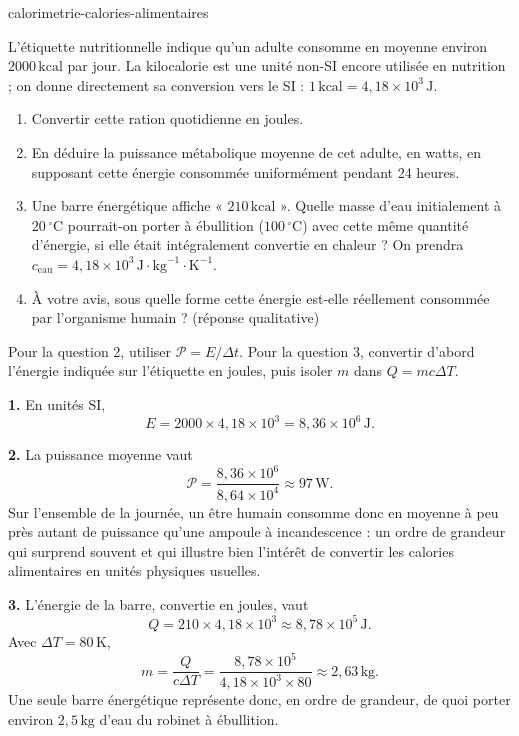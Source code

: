 \begin{exo}{calorimetrie-calories-alimentaires}

L'étiquette nutritionnelle indique qu'un adulte consomme en moyenne environ $2000\,\text{kcal}$ par jour. La kilocalorie est une unité non-SI encore utilisée en nutrition ; on donne directement sa conversion vers le SI : $1\,\text{kcal}=4{,}18\times10^3\,\text{J}$.

\begin{enumerate}
  \item Convertir cette ration quotidienne en joules.
  \item En déduire la puissance métabolique moyenne de cet adulte,
  en watts, en supposant cette énergie consommée uniformément pendant 24 heures.
  \item Une barre énergétique affiche « $210\,\text{kcal}$ ». Quelle masse d'eau initialement à $20\,^\circ\text{C}$ pourrait-on porter à ébullition ($100\,^\circ\text{C}$) avec cette même quantité d'énergie, si elle était intégralement convertie en chaleur ? On prendra $c_{\text{eau}} = 4{,}18\times10^3\,\text{J}\!\cdot\!\text{kg}^{-1}\!\cdot\!\text{K}^{-1}$.
  \item À votre avis, sous quelle forme cette énergie est-elle réellement consommée par l'organisme humain ? (réponse qualitative)
\end{enumerate}

\begin{indication}
Pour la question 2, utiliser $\mathcal P=E/\Delta t$. Pour la question 3, convertir d'abord l'énergie indiquée sur l'étiquette en joules, puis isoler $m$ dans $Q=mc\Delta T$.
\end{indication}

\begin{solution}
\textbf{1.} En unités SI,
\[
E=2000\times4{,}18\times10^3
=8{,}36\times10^6\,\text{J}.
\]

\textbf{2.} La puissance moyenne vaut
\[
\mathcal{P} = \frac{8{,}36\times10^6}{8{,}64\times10^4} \approx 97\,\text{W}.
\]
Sur l'ensemble de la journée, un être humain consomme donc en moyenne à peu près autant de puissance qu'une ampoule à incandescence : un ordre de grandeur qui surprend souvent et qui illustre bien l'intérêt de convertir les calories alimentaires en unités physiques usuelles.

\textbf{3.} L'énergie de la barre, convertie en joules, vaut
\[
Q=210\times4{,}18\times10^3
\approx8{,}78\times10^5\,\text{J}.
\]
Avec $\Delta T=80\,\text{K}$,
\[
m = \frac{Q}{c\Delta T}
= \frac{8{,}78\times10^5}{4{,}18\times10^3\times80}
\approx2{,}63\,\text{kg}.
\]
Une seule barre énergétique représente donc, en ordre de grandeur, de quoi porter environ $2{,}5\,\text{kg}$ d'eau du robinet à ébullition.


\end{solution}
\end{exo}
